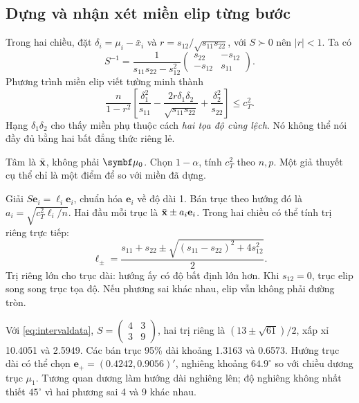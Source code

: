 \subsection{Dựng và nhận xét miền elip từng bước}
\label{sec:construct_regions}
Trong hai chiều, đặt $\delta_i=\mu_i-\bar x_i$ và
$r=s_{12}/\sqrt{s_{11}s_{22}}$, với $S\succ0$ nên $|r|<1$.
Ta có
\[
 S^{-1}=\frac1{s_{11}s_{22}-s_{12}^2}
 \begin{pmatrix}s_{22}&-s_{12}\\-s_{12}&s_{11}\end{pmatrix}.
\]
Phương trình miền elip viết tường minh thành
\begin{equation}
 \frac n{1-r^2}\left[
 \frac{\delta_1^2}{s_{11}}
 -\frac{2r\delta_1\delta_2}{\sqrt{s_{11}s_{22}}}
 +\frac{\delta_2^2}{s_{22}}\right]\le c_T^2.
 \label{eq:ellipse_correlation}
\end{equation}
Hạng $\delta_1\delta_2$ cho thấy miền phụ thuộc cách \emph{hai tọa độ
cùng lệch}. Nó không thể nói đầy đủ bằng hai bất đẳng thức riêng lẻ.

Tâm là $\bar{\mathbf x}$, không phải $\vmu_0$. Chọn $1-\alpha$, tính $c_T^2$
theo $n,p$. Một giả thuyết cụ thể chỉ là một điểm để so với miền đã dựng.

Giải $S\mathbf e_i=\ell_i\mathbf e_i$, chuẩn hóa $\mathbf e_i$ về độ
dài 1. Bán trục theo hướng đó là $a_i=\sqrt{c_T^2\ell_i/n}$.
Hai đầu mỗi trục là $\bar{\mathbf x}\pm a_i\mathbf e_i$.
Trong hai chiều có thể tính trị riêng trực tiếp:
\[
 \ell_{\pm}=\frac{s_{11}+s_{22}
 \pm\sqrt{(s_{11}-s_{22})^2+4s_{12}^2}}2.
\]
Trị riêng lớn cho trục dài: hướng ấy có độ bất định lớn hơn.
Khi $s_{12}=0$, trục elip song song trục tọa độ. Nếu phương sai khác
nhau, elip vẫn không phải đường tròn.

\begin{example}[Trục của elip trong ví dụ $n=40$]
Với \eqref{eq:intervaldata}, $S=\begin{pmatrix}4&3\\3&9\end{pmatrix}$,
hai trị riêng là $(13\pm\sqrt{61})/2$, xấp xỉ 10.4051 và 2.5949.
Các bán trục 95\% dài khoảng 1.3163 và 0.6573.
Hướng trục dài có thể chọn $\mathbf e_+=(0.4242,0.9056)'$,
nghiêng khoảng $64.9^\circ$ so với chiều dương trục $\mu_1$.
Tương quan dương làm hướng dài nghiêng lên; độ nghiêng không nhất thiết
$45^\circ$ vì hai phương sai 4 và 9 khác nhau.
\end{example}

